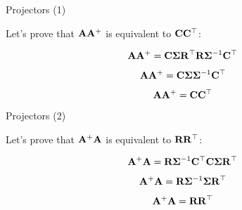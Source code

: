 \documentclass{beamer}
\begin{document}
\begin{frame}{Projectors (1)}
	\begin{flushleft}
		
		Let's prove that $\mathbf{A}\mathbf{A}^+$ is equivalent to $\mathbf{C}\mathbf{C}^\top$:
		
		\begin{equation}
			\mathbf{A} \mathbf{A}^+ = 
			\mathbf{C} \mathbf{\Sigma} \mathbf{R}^\top 
			\mathbf{R} \mathbf{\Sigma}^{-1} \mathbf{C}^\top
		\end{equation}
		
		
		\begin{equation}
			\mathbf{A} \mathbf{A}^+ = 
			\mathbf{C} \mathbf{\Sigma} \mathbf{\Sigma}^{-1} \mathbf{C}^\top
		\end{equation}
		
		\begin{equation}
			\mathbf{A} \mathbf{A}^+ = 
			\mathbf{C} \mathbf{C}^\top
		\end{equation}
		
		
	\end{flushleft}
\end{frame}



\begin{frame}{Projectors (2)}
	\begin{flushleft}
		
		Let's prove that $\mathbf{A}^+\mathbf{A}$ is equivalent to $\mathbf{R}\mathbf{R}^\top$:
		
		\begin{equation}
			\mathbf{A}^+ \mathbf{A} = 
			\mathbf{R} \mathbf{\Sigma}^{-1} \mathbf{C}^\top
			\mathbf{C} \mathbf{\Sigma} \mathbf{R}^\top 
		\end{equation}
		
		\begin{equation}
			\mathbf{A}^+ \mathbf{A} = 
			\mathbf{R} \mathbf{\Sigma}^{-1} \mathbf{\Sigma} \mathbf{R}^\top 
		\end{equation}		
		
		\begin{equation}
			\mathbf{A}^+ \mathbf{A} = 
			\mathbf{R} \mathbf{R}^\top 
		\end{equation}			
		
	\end{flushleft}
\end{frame}
\end{document}
